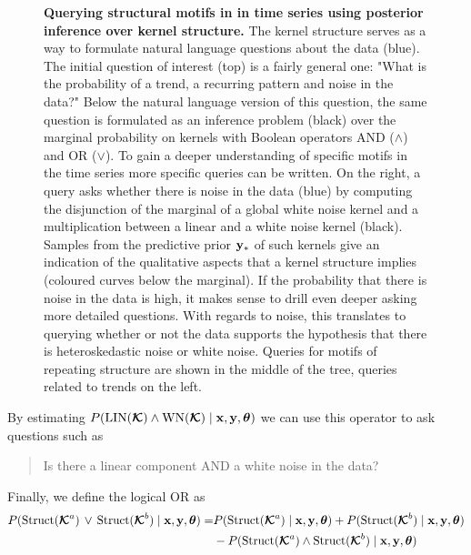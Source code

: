 \begin{figure}
\centering

\caption{{\footnotesize \bf Querying structural motifs in in time series using posterior inference
over kernel structure.} The kernel structure serves as a way to formulate
natural language questions about the data (blue). The initial question of interest
(top) is a fairly
general one: "What is the probability of a trend, a recurring
pattern and noise in the data?" Below the natural language version of this
question, the same question is formulated as an inference problem (black) over the
marginal probability on kernels with Boolean operators AND ($\land$) and OR ($\lor$). 
To gain  a deeper understanding of specific motifs in the time series more specific queries can
be written.
On the right, a query asks whether there is noise in the data (blue) by computing the disjunction of the marginal
of a global white noise kernel and a multiplication between a linear and a white
noise kernel (black). Samples from the predictive prior $\mathbf{y}_*$ of such kernels give an
indication of the qualitative aspects that a kernel structure implies (coloured curves below
the marginal). 
If the probability that there is noise in the data is high, it makes sense
to drill even deeper asking more detailed questions. With regards to noise, this
translates to querying whether or not the data supports the hypothesis that there is
heteroskedastic noise or white noise. Queries for motifs of repeating structure
are shown in the middle of the tree, queries related to trends on the left.}\label{fig:query}
\end{figure}
By estimating $P(\text{LIN}(\bm{\mathcal{K}}) \land \text{WN}(\bm{\mathcal{K}}) \mid \mathbf{x}, \mathbf{y}, \bm{\theta})$ we can use this operator to ask questions such as 
\begin{quotation}
Is there a linear component AND a white noise in the data? 
\end{quotation}
Finally, we define the logical OR as
\begin{align*}
P(\text{Struct}(\bm{\mathcal{K}}^a)\, \lor\, \text{Struct}(\bm{\mathcal{K}}^b) \mid \mathbf{x}, \mathbf{y}, \bm{\theta})
=& P(\text{Struct}(\bm{\mathcal{K}}^a) \mid \mathbf{x}, \mathbf{y}, \bm{\theta}) + P(\text{Struct}(\bm{\mathcal{K}}^b) \mid \mathbf{x}, \mathbf{y}, \bm{\theta})\\
 &- P(\text{Struct}(\bm{\mathcal{K}}^a) \land \text{Struct}(\bm{\mathcal{K}}^b) \mid \mathbf{x}, \mathbf{y}, \bm{\theta})
\end{align*}
